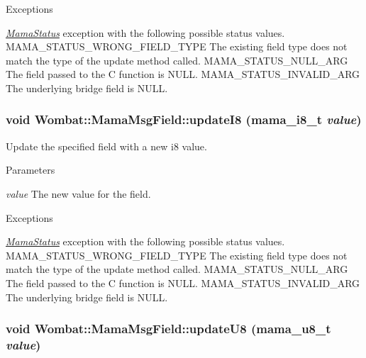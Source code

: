 \begin{DoxyExceptions}{Exceptions}
\item[{\em \hyperlink{classWombat_1_1MamaStatus}{MamaStatus}}]exception with the following possible status values. MAMA\_\-STATUS\_\-WRONG\_\-FIELD\_\-TYPE The existing field type does not match the type of the update method called. MAMA\_\-STATUS\_\-NULL\_\-ARG The field passed to the C function is NULL. MAMA\_\-STATUS\_\-INVALID\_\-ARG The underlying bridge field is NULL. \end{DoxyExceptions}
\hypertarget{classWombat_1_1MamaMsgField_ac68d4fc1af06c6b98167613dd9a658dc}{
\subsubsection[{updateI8}]{\setlength{\rightskip}{0pt plus 5cm}void Wombat::MamaMsgField::updateI8 (mama\_\-i8\_\-t {\em value})}}
\label{classWombat_1_1MamaMsgField_ac68d4fc1af06c6b98167613dd9a658dc}


Update the specified field with a new i8 value. 
\begin{DoxyParams}{Parameters}
\item[{\em value}]The new value for the field.\end{DoxyParams}

\begin{DoxyExceptions}{Exceptions}
\item[{\em \hyperlink{classWombat_1_1MamaStatus}{MamaStatus}}]exception with the following possible status values. MAMA\_\-STATUS\_\-WRONG\_\-FIELD\_\-TYPE The existing field type does not match the type of the update method called. MAMA\_\-STATUS\_\-NULL\_\-ARG The field passed to the C function is NULL. MAMA\_\-STATUS\_\-INVALID\_\-ARG The underlying bridge field is NULL. \end{DoxyExceptions}
\hypertarget{classWombat_1_1MamaMsgField_a81154aeb9730cc5f45bca72aae3cb1b7}{
\subsubsection[{updateU8}]{\setlength{\rightskip}{0pt plus 5cm}void Wombat::MamaMsgField::updateU8 (mama\_\-u8\_\-t {\em value})}}
\label{classWombat_1_1MamaMsgField_a81154aeb9730cc5f45bca72aae3cb1b7}


